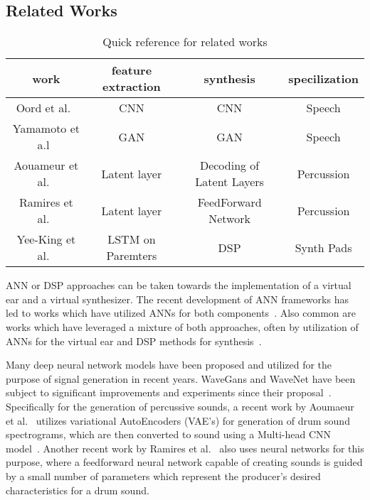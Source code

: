 \documentclass[\main/thesis.tex]{subfiles}
\begin{document}

\subsection{Related Works}
\label{related}

\begin{center}
\begin{table}[]
\begin{tabular}{||c c c c||} 
\hline
work & feature extraction & synthesis & specilization  \\
	\hline
Oord et al.~\cite{oord2016wavenet} & CNN & CNN &Speech \\ 
	\hline
Yamamoto et a.l~\cite{yamamoto2020parallel} & GAN & GAN&Speech  \\ 
	\hline
Aouameur et al.~\cite{aouameur2019neural} & Latent layer& Decoding of Latent Layers & Percussion  \\ 
	\hline
Ramires et al.~\cite{ramires2020neural} & Latent layer & FeedForward Network & Percussion  \\ 
	\hline
Yee-King et al.~\cite{yee2018automatic} & LSTM on Paremters & DSP & Synth Pads  \\ 
	\hline
\end{tabular}
\caption{Quick reference for related works}
\end{table}
\end{center}

ANN or DSP approaches can be taken towards the implementation of a virtual ear and a virtual synthesizer. The recent development of ANN frameworks has led to works which have utilized ANNs for both components~\cite{oord2016wavenet,yamamoto2020parallel,ramires2020neural}. Also common are works which have leveraged a mixture of both approaches, often by utilization of ANNs for the virtual ear and DSP methods for synthesis~\cite{aouameur2019neural,yee2018automatic}.

Many deep neural network models have been proposed and utilized for the purpose of signal generation in recent years. WaveGans and WaveNet have been subject to significant improvements and experiments since their proposal~\cite{nsynth2017,yamamoto2020parallel,oord2017parallel}. Specifically for the generation of percussive sounds, a recent work by Aoumaeur et al.~\cite{aouameur2019neural} utilizes variational AutoEncoders (VAE's) for generation of drum sound spectrograms, which are then converted to sound using a Multi-head CNN model~\cite{aouameur2019neural}. Another recent work by Ramires et al.~\cite{ramires2020neural} also uses neural networks for this purpose, where a feedforward neural network capable of creating sounds is guided by a small number of parameters which represent the producer's desired characteristics for a drum sound. 
\end{document}
